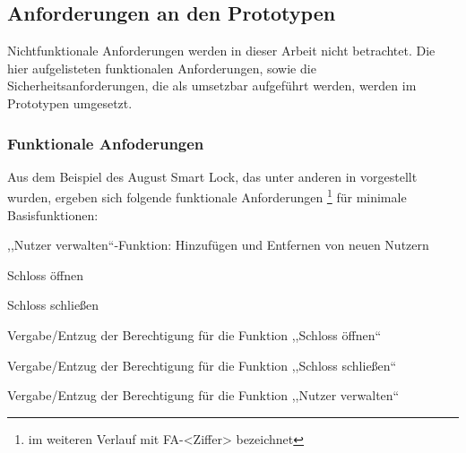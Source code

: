 \subsection{Anforderungen an den Prototypen}
\label{sec:prototype_requirements}
    Nichtfunktionale Anforderungen werden in dieser Arbeit nicht betrachtet. 
    Die hier aufgelisteten funktionalen Anforderungen, sowie die Sicherheitsanforderungen, die als umsetzbar aufgeführt werden, werden im Prototypen umgesetzt. 
    
\subsubsection{Funktionale Anfoderungen}
\label{sec:prototype_func_req}
    Aus dem Beispiel des August Smart Lock, das unter anderen in  vorgestellt wurden, ergeben sich folgende funktionale Anforderungen 
    \!\footnote{im weiteren Verlauf mit FA-<Ziffer> bezeichnet} 
    für minimale Basisfunktionen:
    \begin{FA}[noitemsep]
        \item \label{fa:1},,Nutzer verwalten``-Funktion: Hinzufügen und Entfernen von neuen Nutzern
        \item \label{fa:2}Schloss öffnen
        \item \label{fa:3}Schloss schließen
        \item \label{fa:4}Vergabe/Entzug der Berechtigung für die Funktion ,,Schloss öffnen``
        \item \label{fa:5}Vergabe/Entzug der Berechtigung für die Funktion ,,Schloss schließen``
        \item \label{fa:6}Vergabe/Entzug der Berechtigung für die Funktion ,,Nutzer verwalten``
    \end{FA}

